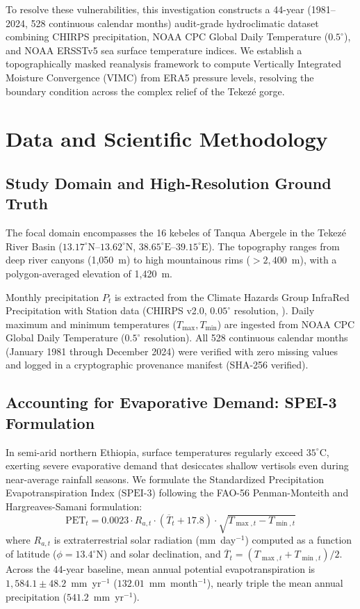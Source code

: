 \documentclass{article}
\begin{document}
To resolve these vulnerabilities, this investigation constructs a 44-year (1981--2024, 528 continuous calendar months) audit-grade hydroclimatic dataset combining CHIRPS precipitation, NOAA CPC Global Daily Temperature ($0.5^\circ$), and NOAA ERSSTv5 sea surface temperature indices. We establish a topographically masked reanalysis framework to compute Vertically Integrated Moisture Convergence (VIMC) from ERA5 pressure levels, resolving the boundary condition across the complex relief of the Tekez\'{e} gorge.

\section{Data and Scientific Methodology}
\label{sec:data_methods}

\subsection{Study Domain and High-Resolution Ground Truth}
The focal domain encompasses the 16 kebeles of Tanqua Abergele in the Tekez\'{e} River Basin ($13.17^\circ\text{N}$--$13.62^\circ\text{N}$, $38.65^\circ\text{E}$--$39.15^\circ\text{E}$). The topography ranges from deep river canyons (1,050~m) to high mountainous rims ($>2,400$~m), with a polygon-averaged elevation of 1,420~m. 

Monthly precipitation $P_t$ is extracted from the Climate Hazards Group InfraRed Precipitation with Station data (CHIRPS v2.0, $0.05^\circ$ resolution, \citealt{funk_chirps_2015}). Daily maximum and minimum temperatures ($T_{\max}, T_{\min}$) are ingested from NOAA CPC Global Daily Temperature ($0.5^\circ$ resolution). All 528 continuous calendar months (January 1981 through December 2024) were verified with zero missing values and logged in a cryptographic provenance manifest (SHA-256 verified).

\subsection{Accounting for Evaporative Demand: SPEI-3 Formulation}
In semi-arid northern Ethiopia, surface temperatures regularly exceed $35^\circ\text{C}$, exerting severe evaporative demand that desiccates shallow vertisols even during near-average rainfall seasons. We formulate the Standardized Precipitation Evapotranspiration Index ($\text{SPEI-3}$) following the FAO-56 Penman-Monteith and Hargreaves-Samani formulation:
\begin{equation}
\text{PET}_t = 0.0023 \cdot R_{a,t} \cdot \left( \overline{T}_t + 17.8 \right) \cdot \sqrt{T_{\max, t} - T_{\min, t}}
\label{eq:pet}
\end{equation}
where $R_{a,t}$ is extraterrestrial solar radiation (mm~day$^{-1}$) computed as a function of latitude ($\phi = 13.4^\circ\text{N}$) and solar declination, and $\overline{T}_t = (T_{\max, t} + T_{\min, t})/2$. Across the 44-year baseline, mean annual potential evapotranspiration is $1,584.1\pm 48.2$~mm~yr$^{-1}$ ($132.01$~mm~month$^{-1}$), nearly triple the mean annual precipitation ($541.2$~mm~yr$^{-1}$).
\end{document}
